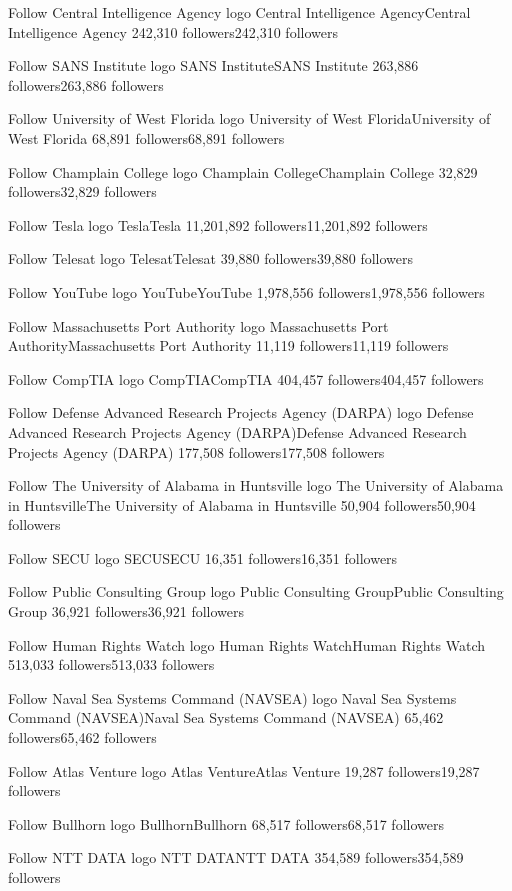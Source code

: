 Follow
Central Intelligence Agency logo
Central Intelligence AgencyCentral Intelligence Agency
242,310 followers242,310 followers

Follow
SANS Institute logo
SANS InstituteSANS Institute
263,886 followers263,886 followers

Follow
University of West Florida logo
University of West FloridaUniversity of West Florida
68,891 followers68,891 followers

Follow
Champlain College logo
Champlain CollegeChamplain College
32,829 followers32,829 followers

Follow
Tesla logo
TeslaTesla
11,201,892 followers11,201,892 followers

Follow
Telesat logo
TelesatTelesat
39,880 followers39,880 followers

Follow
YouTube logo
YouTubeYouTube
1,978,556 followers1,978,556 followers

Follow
Massachusetts Port Authority logo
Massachusetts Port AuthorityMassachusetts Port Authority
11,119 followers11,119 followers

Follow
CompTIA logo
CompTIACompTIA
404,457 followers404,457 followers

Follow
Defense Advanced Research Projects Agency (DARPA) logo
Defense Advanced Research Projects Agency (DARPA)Defense Advanced Research Projects Agency (DARPA)
177,508 followers177,508 followers

Follow
The University of Alabama in Huntsville logo
The University of Alabama in HuntsvilleThe University of Alabama in Huntsville
50,904 followers50,904 followers

Follow
SECU logo
SECUSECU
16,351 followers16,351 followers

Follow
Public Consulting Group logo
Public Consulting GroupPublic Consulting Group
36,921 followers36,921 followers

Follow
Human Rights Watch logo
Human Rights WatchHuman Rights Watch
513,033 followers513,033 followers

Follow
Naval Sea Systems Command (NAVSEA) logo
Naval Sea Systems Command (NAVSEA)Naval Sea Systems Command (NAVSEA)
65,462 followers65,462 followers

Follow
Atlas Venture logo
Atlas VentureAtlas Venture
19,287 followers19,287 followers

Follow
Bullhorn logo
BullhornBullhorn
68,517 followers68,517 followers

Follow
NTT DATA logo
NTT DATANTT DATA
354,589 followers354,589 followers

